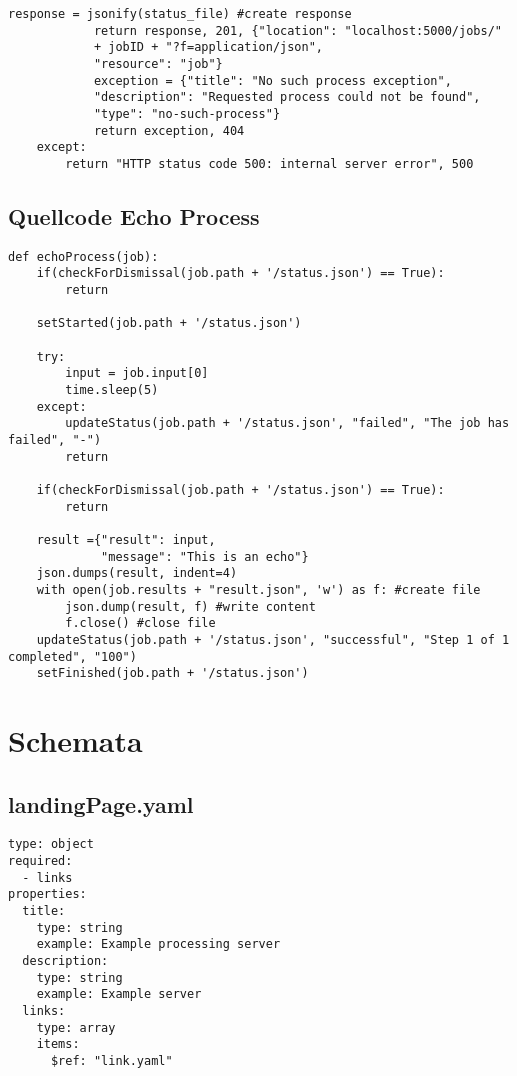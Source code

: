 \begin{lstlisting}[caption={Process Execution}, style = Python]
            response = jsonify(status_file) #create response
            return response, 201, {"location": "localhost:5000/jobs/" 
            + jobID + "?f=application/json", 
            "resource": "job"} 
            exception = {"title": "No such process exception", 
            "description": "Requested process could not be found", 
            "type": "no-such-process"}
            return exception, 404 
    except:
        return "HTTP status code 500: internal server error", 500
\end{lstlisting}\label{appendixProcessExecution}   

\newpage
\subsection{Quellcode Echo Process}
\begin{lstlisting}[caption={Echo Process}, style = Python]
def echoProcess(job):
    if(checkForDismissal(job.path + '/status.json') == True):
        return
    
    setStarted(job.path + '/status.json')
    
    try:
        input = job.input[0]
        time.sleep(5)
    except:
        updateStatus(job.path + '/status.json', "failed", "The job has failed", "-")
        return
    
    if(checkForDismissal(job.path + '/status.json') == True):
        return
    
    result ={"result": input,
             "message": "This is an echo"}
    json.dumps(result, indent=4)
    with open(job.results + "result.json", 'w') as f: #create file
        json.dump(result, f) #write content
        f.close() #close file
    updateStatus(job.path + '/status.json', "successful", "Step 1 of 1 completed", "100")
    setFinished(job.path + '/status.json')
\end{lstlisting}\label{appendixEchoProcess}  

\section{Schemata}
\renewcommand{\lstlistingname}{Schema}  
\subsection{landingPage.yaml}
\begin{lstlisting}[caption={landingPage.yaml}, style = JSON]
type: object
required:
  - links
properties:
  title:
    type: string
    example: Example processing server
  description:
    type: string
    example: Example server 
  links:
    type: array
    items:
      $ref: "link.yaml"
\end{lstlisting}\label{appendixlandngPageyaml}  

